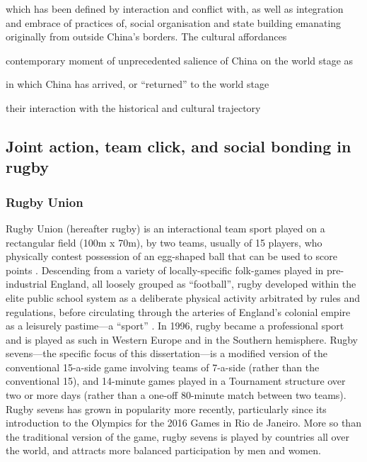 which has been defined by interaction and conflict with, as well as integration and embrace of practices of, social organisation and state building emanating originally from outside China's borders.  The cultural affordances

 contemporary moment of unprecedented salience of China on the world stage as


 in which China has arrived, or ``returned'' to the world stage

their interaction with the historical and cultural trajectory




\subsection{Joint action, team click, and social bonding in rugby}

  \subsubsection{Rugby Union}
  Rugby Union (hereafter rugby) is an interactional team sport played on a rectangular field (100m x 70m), by two teams, usually of 15 players, who physically contest possession of an egg-shaped ball that can be used to score points \citep{IRB2014}.  Descending from a variety of locally-specific folk-games played in pre-industrial England, all loosely grouped as ``football'', rugby developed within the elite public school system as a deliberate physical activity arbitrated by rules and regulations, before circulating through the arteries of England's colonial empire as a leisurely pastime—a ``sport'' \citep{Dunning2005}.  In 1996, rugby became a professional sport and is played as such in Western Europe and in the Southern hemisphere. Rugby sevens---the specific focus of this dissertation---is a modified version of the conventional 15-a-side game involving teams of 7-a-side (rather than the conventional 15), and 14-minute games played in a Tournament structure over two or more days (rather than a one-off 80-minute match between two teams).  Rugby sevens has grown in popularity more recently, particularly since its introduction to the Olympics for the 2016 Games in Rio de Janeiro.  More so than the traditional version of the game, rugby sevens is played by countries all over the world, and attracts more balanced participation by men and women.

